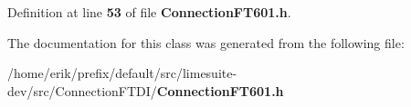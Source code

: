 Definition at line {\bf 53} of file {\bf Connection\+F\+T601.\+h}.



The documentation for this class was generated from the following file\+:\begin{DoxyCompactItemize}
\item 
/home/erik/prefix/default/src/limesuite-\/dev/src/\+Connection\+F\+T\+D\+I/{\bf Connection\+F\+T601.\+h}\end{DoxyCompactItemize}
